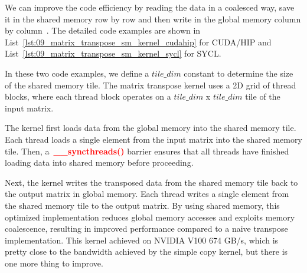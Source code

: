 \par
We can improve the code efficiency by reading the data in a coalesced way, save it in the shared memory row by row and then write in the global memory column by column~\cite{matrix_transpose_efficient, matrix_transpose_advanced}.
The detailed code examples are shown in List~\ref{lst:09_matrix_transpose_sm_kernel_cudahip} for CUDA/HIP and List~\ref{lst:09_matrix_transpose_sm_kernel_sycl} for SYCL.







\par
In these two code examples, we define a $tile\_dim$ constant to determine the size of the shared memory tile.
The matrix transpose kernel uses a 2D grid of thread blocks, where each thread block operates on a $tile\_dim$ x $tile\_dim$ tile of the input matrix.

\par
The kernel first loads data from the global memory into the shared memory tile.
Each thread loads a single element from the input matrix into the shared memory tile.
Then, a~\textbf{\textcolor{red}{\_\_syncthreads()}} barrier ensures that all threads have finished loading data into shared memory before proceeding.


\par
Next, the kernel writes the transposed data from the shared memory tile back to the output matrix in global memory.
Each thread writes a single element from the shared memory tile to the output matrix.
By using shared memory, this optimized implementation reduces global memory accesses and exploits memory coalescence, resulting in improved performance compared to a naive transpose implementation.
This kernel achieved on NVIDIA V100 674 GB/s, which is pretty close to the bandwidth achieved by the simple copy kernel, but there is one more thing to improve.


